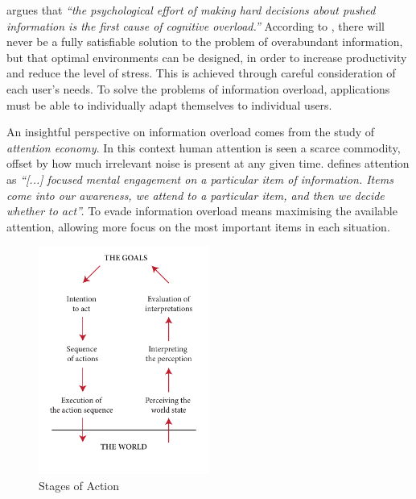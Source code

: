 \cite{Kirsh2000} argues that 
\emph{``the psychological effort of making hard decisions about \emph{pushed} information is the first cause of cognitive overload.''} 
According to \citeauthor{Kirsh2000}, there will never be a fully satisfiable solution to the problem of overabundant information, 
but that optimal environments can be designed,
in order to increase productivity and reduce the level of stress.
This is achieved through careful consideration of each user's needs. 
To solve the problems of information overload, 
applications must be able to individually adapt themselves to individual users. 

An insightful perspective on information overload comes from the study of \emph{attention economy}. 
In this context human attention is seen a scarce commodity, offset by how much irrelevant noise is present at any given time. 
\citet[p1]{Davenport2001} defines attention as \emph{``[...] focused mental engagement on a particular item of information. 
Items come into our awareness, we attend to a particular item, and then we decide whether to act''.} 
To evade information overload means maximising the available attention, allowing more focus on the most important items in each situation.

\begin{figure}
  \vspace{-20pt}
  \begin{center}
    \includegraphics[width=0.5\textwidth]{../graphics/seven-stages.pdf}
    \vspace{-20pt}
    \caption[The Seven Stages of Action]{Stages of Action}
  \end{center}
  \label{fig:seven-stages}
  \vspace{-20pt}
\end{figure}

